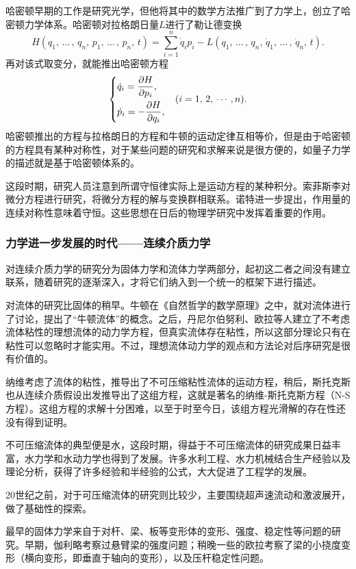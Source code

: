 哈密顿早期的工作是研究光学，但他将其中的数学方法推广到了力学上，创立了哈密顿力学体系。哈密顿对拉格朗日量$L$进行了勒让德变换
\[
	H\left(q_1,\,\dots\,,\,q_n,\,p_1,\,\dots\,,\,p_n,\,t\right)=\sum_{i=1}^n{\dot{q}_ip_i}-L\left( q_1,\,\dots \,,\,q_n,\,\dot{q}_1,\,\dots \,,\,\dot{q}_n,\,t \right)
	.\]
再对该式取变分，就能推出哈密顿方程
\[
	\begin{dcases}
		\dot{q}_i=\dfrac{\partial H}{\partial p_i},   \\
		\dot{p}_i=-\dfrac{\partial H}{\partial q_i} , \\
	\end{dcases} \quad \left( i=1,\,2,\,\cdots \,,n \right)
	.\]
哈密顿推出的方程与拉格朗日的方程和牛顿的运动定律互相等价，但是由于哈密顿的方程具有某种对称性，对于某些问题的研究和求解来说是很方便的，如量子力学的描述就是基于哈密顿体系的。

这段时期，研究人员注意到所谓守恒律实际上是运动方程的某种积分。索菲斯李对微分方程进行研究，将微分方程的解与变换群相联系。诺特进一步提出，作用量的连续对称性意味着守恒。这些思想在日后的物理学研究中发挥着重要的作用。

\subsubsection{力学进一步发展的时代——连续介质力学}

对连续介质力学的研究分为固体力学和流体力学两部分，起初这二者之间没有建立联系，随着研究的逐渐深入，才将它们纳入到一个统一的框架下进行描述。

对流体的研究比固体的稍早。牛顿在《自然哲学的数学原理》之中，就对流体进行了讨论，提出了“牛顿流体”的概念。之后，丹尼尔伯努利、欧拉等人建立了不考虑流体粘性的理想流体的动力学方程，但真实流体存在粘性，所以这部分理论只有在粘性可以忽略时才能实用。不过，理想流体动力学的观点和方法论对后序研究是很有价值的。

纳维考虑了流体的粘性，推导出了不可压缩粘性流体的运动方程，稍后，斯托克斯也从连续介质假设出发推导出了这组方程，这就是著名的纳维-斯托克斯方程（N-S方程）。这组方程的求解十分困难，以至于时至今日，该组方程光滑解的存在性还没有得到证明。

不可压缩流体的典型便是水，这段时期，得益于不可压缩流体的研究成果日益丰富，水力学和水动力学也得到了发展。许多水利工程、水力机械结合生产经验以及理论分析，获得了许多经验和半经验的公式，大大促进了工程学的发展。

20世纪之前，对于可压缩流体的研究则比较少，主要围绕超声速流动和激波展开，做了基础性的探索。

最早的固体力学来自于对杆、梁、板等变形体的变形、强度、稳定性等问题的研究。早期，伽利略考察过悬臂梁的强度问题；稍晚一些的欧拉考察了梁的小挠度变形（横向变形，即垂直于轴向的变形），以及压杆稳定性问题。

